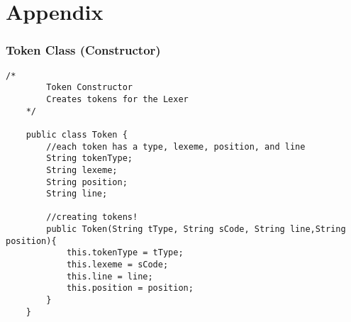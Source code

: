 \documentclass[letterpaper, 10pt,DIV=13]{scrartcl}
\numberwithin{equation}{section} %
\numberwithin{figure}{section} %
\numberwithin{table}{section} %
\begin{document}

\pagebreak


\section{Appendix}

\subsubsection*{Token Class (Constructor)}
    \lstset{numbers=left, numberstyle=\tiny, stepnumber=1, numbersep=5pt, basicstyle=\footnotesize\ttfamily}
    \begin{lstlisting}[frame=single, ]
    /*
        Token Constructor
        Creates tokens for the Lexer
    */
    
    public class Token {
        //each token has a type, lexeme, position, and line
        String tokenType;
        String lexeme;
        String position;
        String line;
        
        //creating tokens!
        public Token(String tType, String sCode, String line,String position){
            this.tokenType = tType;
            this.lexeme = sCode;
            this.line = line;
            this.position = position;
        }
    }
    \end{lstlisting}
\end{document}
